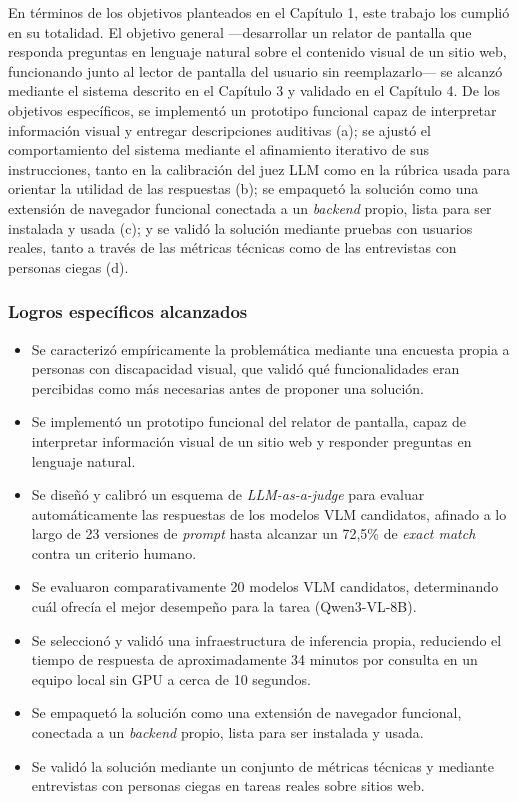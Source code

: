En términos de los objetivos planteados en el Capítulo 1, este trabajo los cumplió en su totalidad. El objetivo general —desarrollar un relator de pantalla que responda preguntas en lenguaje natural sobre el contenido visual de un sitio web, funcionando junto al lector de pantalla del usuario sin reemplazarlo— se alcanzó mediante el sistema descrito en el Capítulo 3 y validado en el Capítulo 4. De los objetivos específicos, se implementó un prototipo funcional capaz de interpretar información visual y entregar descripciones auditivas (a); se ajustó el comportamiento del sistema mediante el afinamiento iterativo de sus instrucciones, tanto en la calibración del juez LLM como en la rúbrica usada para orientar la utilidad de las respuestas (b); se empaquetó la solución como una extensión de navegador funcional conectada a un \textit{backend} propio, lista para ser instalada y usada (c); y se validó la solución mediante pruebas con usuarios reales, tanto a través de las métricas técnicas como de las entrevistas con personas ciegas (d).

\subsubsection{Logros específicos alcanzados}

\begin{itemize}
    \item Se caracterizó empíricamente la problemática mediante una encuesta propia a personas con discapacidad visual, que validó qué funcionalidades eran percibidas como más necesarias antes de proponer una solución.
    \item Se implementó un prototipo funcional del relator de pantalla, capaz de interpretar información visual de un sitio web y responder preguntas en lenguaje natural.
    \item Se diseñó y calibró un esquema de \textit{LLM-as-a-judge} para evaluar automáticamente las respuestas de los modelos VLM candidatos, afinado a lo largo de 23 versiones de \textit{prompt} hasta alcanzar un 72,5\% de \textit{exact match} contra un criterio humano.
    \item Se evaluaron comparativamente 20 modelos VLM candidatos, determinando cuál ofrecía el mejor desempeño para la tarea (Qwen3-VL-8B).
    \item Se seleccionó y validó una infraestructura de inferencia propia, reduciendo el tiempo de respuesta de aproximadamente 34 minutos por consulta en un equipo local sin GPU a cerca de 10 segundos.
    \item Se empaquetó la solución como una extensión de navegador funcional, conectada a un \textit{backend} propio, lista para ser instalada y usada.
    \item Se validó la solución mediante un conjunto de métricas técnicas y mediante entrevistas con personas ciegas en tareas reales sobre sitios web.
\end{itemize}

